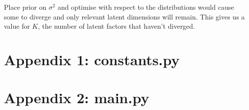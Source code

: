\documentclass[12pt]{article}
\begin{document}
Place prior on $\sigma^2$ and optimise with respect to the distributions would cause some to diverge and only relevant latent dimensions will remain.
This gives us a value for $K$, the number of latent factors that haven't diverged.


\newpage
\section*{Appendix 1: constants.py}

\newpage
\section*{Appendix 2: main.py}

\end{document}
